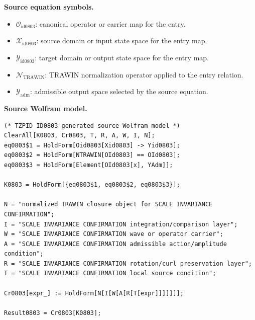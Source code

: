 \begin{minipage}[t]{0.49\linewidth}
\begingroup
\small
\raggedright
\textbf{Source equation symbols.}\par
\begin{itemize}[leftmargin=1.35em,itemsep=1pt,topsep=1pt,parsep=0pt]
    \item $\mathcal{O}_{\mathrm{id0803}}$: canonical operator or carrier map for the entry.
    \item $\mathcal{X}_{\mathrm{id0803}}$: source domain or input state space for the entry map.
    \item $\mathcal{Y}_{\mathrm{id0803}}$: target domain or output state space for the entry map.
    \item $\mathcal{N}_{\mathrm{TRAWIN}}$: TRAWIN normalization operator applied to the entry relation.
    \item $\mathcal{Y}_{\mathrm{adm}}$: admissible output space selected by the source equation.
\end{itemize}
\endgroup
\end{minipage}\hfill
\begin{minipage}[t]{0.47\linewidth}
\begingroup
\scriptsize
\raggedright
\textbf{Source Wolfram model.}\par
\begin{Verbatim}[fontsize=\tiny,breaklines=true,breakanywhere=true]
(* TZPID ID0803 generated source Wolfram model *)
ClearAll[K0803, Cr0803, T, R, A, W, I, N];
eq0803$1 = HoldForm[Oid0803[Xid0803] -> Yid0803];
eq0803$2 = HoldForm[NTRAWIN[OId0803] == OId0803];
eq0803$3 = HoldForm[Element[OId0803[x], YAdm]];

K0803 = HoldForm[{eq0803$1, eq0803$2, eq0803$3}];

N = "normalized TRAWIN closure object for SCALE INVARIANCE CONFIRMATION";
I = "SCALE INVARIANCE CONFIRMATION integration/comparison layer";
W = "SCALE INVARIANCE CONFIRMATION wave or operator carrier";
A = "SCALE INVARIANCE CONFIRMATION admissible action/amplitude condition";
R = "SCALE INVARIANCE CONFIRMATION rotation/curl preservation layer";
T = "SCALE INVARIANCE CONFIRMATION local source condition";

Cr0803[expr_] := HoldForm[N[I[W[A[R[T[expr]]]]]]];

Result0803 = Cr0803[K0803];
\end{Verbatim}
\endgroup
\end{minipage}

